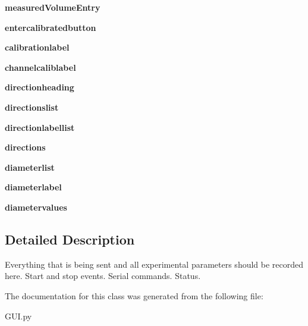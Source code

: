 \begin{DoxyCompactItemize}
\mbox{\label{class_g_u_i_1_1_settings_page_aa0045a745b6fbd7ab096fa52498579c9}} 
{\bfseries measured\+Volume\+Entry}
\item 
\mbox{\label{class_g_u_i_1_1_settings_page_a54d89064888ff0cdfe196474907b2655}} 
{\bfseries entercalibratedbutton}
\item 
\mbox{\label{class_g_u_i_1_1_settings_page_ad38f6bb9d5377fe8b989540271687a7f}} 
{\bfseries calibrationlabel}
\item 
\mbox{\label{class_g_u_i_1_1_settings_page_a159ccaea3679133a984c14e5b7831fb8}} 
{\bfseries channelcaliblabel}
\item 
\mbox{\label{class_g_u_i_1_1_settings_page_a12da53f2f5b25b0d5080fb550cd83f3c}} 
{\bfseries directionheading}
\item 
\mbox{\label{class_g_u_i_1_1_settings_page_a6b63270f039a9bc86b9415c7b34df962}} 
{\bfseries directionslist}
\item 
\mbox{\label{class_g_u_i_1_1_settings_page_a597d9da12474943d5902570ba7704960}} 
{\bfseries directionlabellist}
\item 
\mbox{\label{class_g_u_i_1_1_settings_page_a9e1a8320c37b53d92dc6b0c2002d691d}} 
{\bfseries directions}
\item 
\mbox{\label{class_g_u_i_1_1_settings_page_ab5f709e6a5dd93bc4e0af4b10c1df15a}} 
{\bfseries diameterlist}
\item 
\mbox{\label{class_g_u_i_1_1_settings_page_a9cc6fad3f9bda2f1fd9aa4f2b0746f66}} 
{\bfseries diameterlabel}
\item 
\mbox{\label{class_g_u_i_1_1_settings_page_a933126547957dd113bbe904d22ac0039}} 
{\bfseries diametervalues}
\end{DoxyCompactItemize}


\subsection{Detailed Description}
\begin{DoxyVerb}Everything that is being sent and all experimental parameters
should be recorded here. Start and stop events. Serial commands. Status.
\end{DoxyVerb}
 

The documentation for this class was generated from the following file\+:\begin{DoxyCompactItemize}
\item 
G\+U\+I.\+py\end{DoxyCompactItemize}
